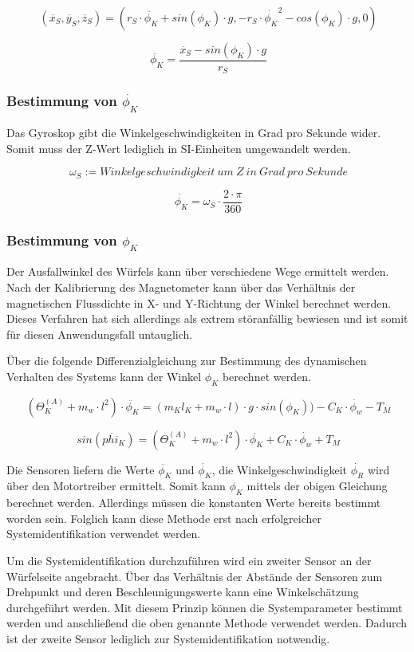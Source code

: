 \documentclass{article}
\begin{document}
\[\ (\ddot{x_S}, \ddot{y_S}, \ddot{z_S}) = (r_S \cdot \ddot{\phi_K} + sin(\phi_K) \cdot g , -r_S \cdot {\dot{\phi_K}}^2 - cos(\phi_K) \cdot g , 0) \]

\[\ \ddot{\phi_K} = \frac{\ddot{x_S} - sin(\phi_K) \cdot g }{r_S} \]

\subsubsection{Bestimmung von $\dot{\phi_K}$}
Das Gyroskop gibt die Winkelgeschwindigkeiten in Grad pro Sekunde wider. Somit muss der Z-Wert lediglich in SI-Einheiten umgewandelt werden.

\[\ {\omega_S} := Winkelgeschwindigkeit \ um \ Z \ in \ Grad \ pro \ Sekunde \]

\[\ \dot{\phi_K} = {\omega_S} \cdot \frac{2 \cdot \pi}{360} \]

\subsubsection{Bestimmung von $\phi_K$}
Der Ausfallwinkel des Würfels kann über verschiedene Wege ermittelt werden. Nach der Kalibrierung des Magnetometer kann über das Verhältnis der magnetischen Flussdichte in X- und Y-Richtung der Winkel berechnet werden. Dieses Verfahren hat sich allerdings als extrem störanfällig bewiesen und ist somit für diesen Anwendungsfall untauglich.

Über die folgende Differenzialgleichung zur Bestimmung des dynamischen Verhalten des Systems kann der Winkel $\phi_K$ berechnet werden.

\[\ (\Theta_K^{(A)} + m_w \cdot l^2) \cdot \ddot{\phi_K} = (m_K  l_K + m_w \cdot l) \cdot g \cdot sin(\phi_K)) - C_K \cdot \dot{\phi_w} - T_M  \]

\[\ sin(\ddot{phi_K}) = (\Theta_K^{(A)} + m_w \cdot l^2) \cdot \ddot{\phi_K} + C_K \cdot \dot{\phi_w} + T_M \]

Die Sensoren liefern die Werte $\ddot{\phi_K}$ und $\dot{\phi_K}$, die Winkelgeschwindigkeit $\dot{\phi_R}$ wird über den Motortreiber ermittelt. Somit kann $\phi_K$ mittels der obigen Gleichung berechnet werden. Allerdings müssen die konstanten Werte bereits bestimmt worden sein. Folglich kann diese Methode erst nach erfolgreicher Systemidentifikation verwendet werden.

Um die Systemidentifikation durchzuführen wird ein zweiter Sensor an der Würfelseite angebracht. Über das Verhältnis der Abstände der Sensoren zum Drehpunkt und deren Beschleunigungswerte kann eine Winkelschätzung durchgeführt werden. Mit diesem Prinzip können die Systemparameter bestimmt werden und anschließend die oben genannte Methode verwendet werden. Dadurch ist der zweite Sensor lediglich zur Systemidentifikation notwendig.
\end{document}
